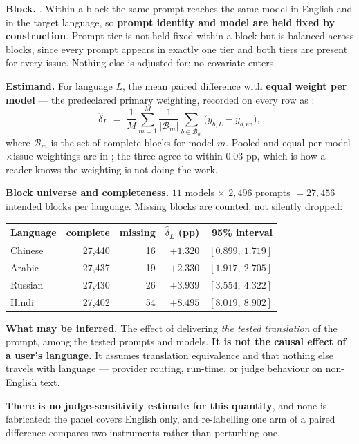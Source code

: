 \documentclass[11pt]{article}
\DeclareRobustCommand{\code}[1]{\texttt{\seqsplit{#1}}}
\begin{document}
\textbf{Block.} \code{model $\times$ prompt\_id}. Within a block the same
prompt reaches the same model in English and in the target language, so
\textbf{prompt identity and model are held fixed by construction}. Prompt tier
is not held fixed within a block but is balanced across blocks, since every
prompt appears in exactly one tier and both tiers are present for every issue.
Nothing else is adjusted for; no covariate enters.

\textbf{Estimand.} For language $L$, the mean paired difference with
\textbf{equal weight per model} --- the predeclared primary weighting, recorded
on every row as \code{primary\_weighting}:
\[
\hat\delta_L \;=\; \frac{1}{M}\sum_{m=1}^{M}
  \frac{1}{|\mathcal{B}_m|}\sum_{b \in \mathcal{B}_m}
  \bigl(y_{b,L} - y_{b,\text{en}}\bigr),
\]
where $\mathcal{B}_m$ is the set of complete blocks for model $m$. Pooled and
equal-per-model$\times$issue weightings are in \code{c08b}; the three agree to
within $0.03$ pp, which is how a reader knows the weighting is not doing the
work.

\textbf{Block universe and completeness.} $11$ models $\times$ $2{,}496$ prompts
$= 27{,}456$ intended blocks per language. Missing blocks are counted, not
silently dropped:

\begin{center}
\small
\begin{tabular}{@{}lrrrr@{}}
\toprule
\textbf{Language} & \textbf{complete} & \textbf{missing} & \textbf{$\hat\delta_L$ (pp)} & \textbf{95\% interval} \\
\midrule
Chinese & 27{,}440 & 16 & $+1.320$ & $[0.899,\ 1.719]$ \\
Arabic  & 27{,}437 & 19 & $+2.330$ & $[1.917,\ 2.705]$ \\
Russian & 27{,}430 & 26 & $+3.939$ & $[3.554,\ 4.322]$ \\
Hindi   & 27{,}402 & 54 & $+8.495$ & $[8.019,\ 8.902]$ \\
\bottomrule
\end{tabular}
\end{center}

\textbf{What may be inferred.} The effect of delivering \emph{the tested
translation} of the prompt, among the tested prompts and models. \textbf{It is
not the causal effect of a user's language.} It assumes translation equivalence
and that nothing else travels with language --- provider routing, run-time, or
judge behaviour on non-English text.

\textbf{There is no judge-sensitivity estimate for this quantity}, and none is
fabricated: the panel covers English only, and re-labelling one arm of a paired
difference compares two instruments rather than perturbing one.
\end{document}
